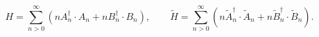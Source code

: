 \begin{equation}
H = \sum_{n>0}^{\infty }\left( nA_{n}^{\dagger }\cdot
A_{n}+nB_{n}^{\dagger }\cdot B_{n}\right),
\qquad
\widetilde{H}=\sum_{n>0}^{\infty }\left( n\tilde{A}_{n}^{\dagger }\cdot 
\tilde{A}_{n}+n\tilde{B}_{n}^{\dagger }\cdot \tilde{B}_{n}\right) .
\end{equation}

